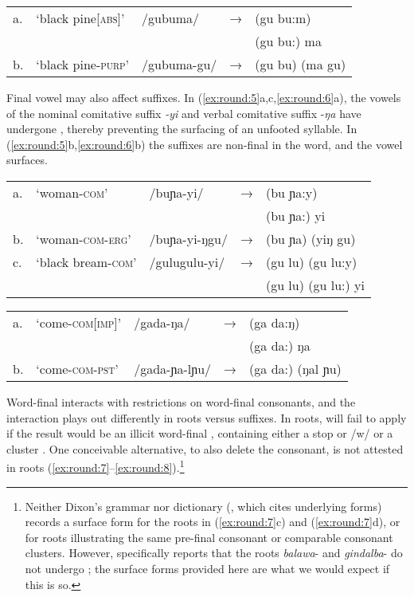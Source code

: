 \documentclass[output=paper,
modfonts
]{LSP/langsci}
\begin{document}
\ex \label{ex:round:4} 
\begin{tabular}[t]{@{}lllll}
a. &  `black pine[\textsc{abs}]' & /gubuma/  & → & (gu bu:m) \\
&&&& \ljudge{*}(gu bu:) ma \\
b. & `black pine\textsc{-purp}' & /gubuma-gu/  & → & (gu bu) (ma gu) \\
\end{tabular}
\z

\noindent Final vowel  may also affect suffixes. In (\ref{ex:round:5}a,c,\ref{ex:round:6}a), the vowels of the nominal comitative suffix \textit{-yi} and verbal comitative suffix -\textit{ŋa} have undergone , thereby preventing the surfacing of an unfooted syllable. In (\ref{ex:round:5}b,\ref{ex:round:6}b) the suffixes are non-final in the word, and the vowel surfaces. 

\ea \label{ex:round:5}
\begin{tabular}[t]{@{}lllll}
a. &  `woman\textsc{-com}' & /buɲa-yi/  & → & (bu ɲa:y) \\
&&&&\ljudge{*}(bu ɲa:) yi \\
b.  &`woman-\textsc{com-erg'} & /buɲa-yi-ŋgu/  & → & (bu ɲa) (yiŋ gu) \\
c.  &`black bream-\textsc{com}' & /gulugulu-yi/  & → & (gu lu) (gu lu:y) \\
 & & & & \ljudge{*}(gu lu) (gu lu:) yi\\
\end{tabular}

\ex \label{ex:round:6}
\begin{tabular}[t]{@{}lllll}
a. & `come\textsc{-com[imp]}' & /gada-ŋa/  & → & (ga da:ŋ) \\
&&&& \ljudge{*}(ga da:) ŋa\\
b. & `come-\textsc{com-pst}' & /gada-ɲa-lɲu/  & → & (ga da:) (ŋal ɲu) \\
\end{tabular}
\z


Word-final  interacts with restrictions on word-final consonants, and the interaction plays out differently in roots versus suffixes. In roots,  will fail to apply if the result would be an illicit word-final , containing either a stop or /w/  or a cluster . One conceivable alternative, to also delete the consonant, is not attested in roots (\ref{ex:round:7}--\ref{ex:round:8}).\footnote{Neither Dixon's grammar \citeyearpar{dixon1977a} nor dictionary (\citealt{dixon1991}, which cites underlying forms) records a surface form for the roots in (\ref{ex:round:7}c) and (\ref{ex:round:7}d), or for roots illustrating the same pre-final consonant or comparable consonant clusters. However, \citet[57--58]{dixon1977a} specifically reports that the roots \textit{balawa}- and \textit{gindalba}- do not undergo ; the surface forms provided here are what we would expect if this is so.}
\end{document}
